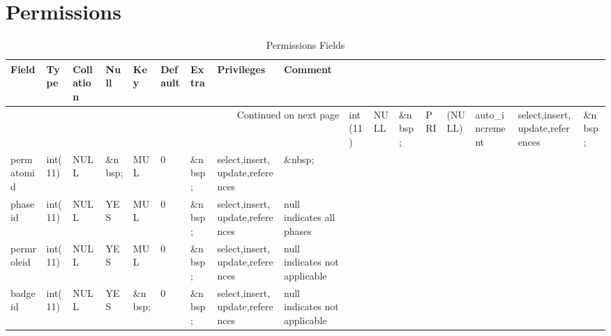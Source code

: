 \documentclass[tablesignature]{scrartcl}
\begin{document}
\section{Permissions}
\label{sec-15}


\begin{longtable}{|l|l|l|l|l|l|l|l|l|}
\caption{Permissions Fields} \label{tbl:permissionsfields}\\
\hline
 Field         &  Type     &  Collation  &  Null     &  Key      &  Default  &  Extra              &  Privileges                       &  Comment                       \\
\hline
\endhead
\hline\multicolumn{9}{r}{Continued on next page}\
\endfoot
\endlastfoot
\hline
 permissionid  &  int(11)  &  NULL       &  \&nbsp;  &  PRI      &   (NULL)  &  auto\_{}increment  &  select,insert,update,references  &  \&nbsp;                        \\
 permatomid    &  int(11)  &  NULL       &  \&nbsp;  &  MUL      &        0  &  \&nbsp;            &  select,insert,update,references  &  \&nbsp;                        \\
 phaseid       &  int(11)  &  NULL       &  YES      &  MUL      &        0  &  \&nbsp;            &  select,insert,update,references  &  null indicates all phases      \\
 permroleid    &  int(11)  &  NULL       &  YES      &  MUL      &        0  &  \&nbsp;            &  select,insert,update,references  &  null indicates not applicable  \\
 badgeid       &  int(11)  &  NULL       &  YES      &  \&nbsp;  &        0  &  \&nbsp;            &  select,insert,update,references  &  null indicates not applicable  \\
\hline
\end{longtable}
\end{document}
